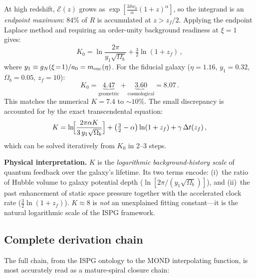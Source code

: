 \documentclass[11pt]{article}
\begin{document}
At high redshift, $\mathcal{E}(z)$ grows as
$\exp[\frac{3\delta w_0}{\alpha}(1+z)^\alpha]$, so the integrand
is an \emph{endpoint maximum}: $84\%$ of $R$ is accumulated
at $z>z_f/2$.  Applying the endpoint Laplace method and requiring
an order-unity background readiness at $\xi=1$ gives:
\begin{equation}\label{eq:K_formula}
  \boxed{K_0 = \ln\frac{2\pi}{y_1\sqrt{\Omega_b}}
  + \tfrac{3}{2}\ln(1+z_f)\,,}
\end{equation}
where $y_1\equiv g_N(\xi\!=\!1)/a_0 = m_{\rm enc}(\eta)$.
For the fiducial galaxy ($\eta=1.16$, $y_1=0.32$,
$\Omega_b=0.05$, $z_f=10$):
\[
  K_0 = \underbrace{4.47}_{\text{geometric}} +
  \underbrace{3.60}_{\text{cosmological}} = 8.07\,.
\]
This matches the numerical $K=7.4$ to $\sim 10\%$.
The small discrepancy is accounted for by the exact
transcendental equation:
\begin{equation}\label{eq:K_transcendental}
  K = \ln\!\Bigl[\frac{2\pi\alpha K}{3\,y_1\sqrt{\Omega_b}}\Bigr]
  + \bigl(\tfrac{3}{2}-\alpha\bigr)\ln(1+z_f)
  + \gamma\,\Delta t(z_f)\,,
\end{equation}
which can be solved iteratively from $K_0$ in 2--3 steps.

\medskip\noindent\textbf{Physical interpretation.}
$K$ is the \emph{logarithmic background-history scale} of quantum
feedback over the galaxy's lifetime.  Its two terms encode:
(i)~the ratio of Hubble volume to galaxy potential depth
($\ln[2\pi/(y_1\sqrt{\Omega_b})]$), and (ii)~the past enhancement
of static space pressure together with the accelerated clock rate
($\frac32\ln(1+z_f)$).
$K\approx 8$ is \emph{not} an unexplained fitting constant---it is
the natural logarithmic scale of the ISPG framework.

\subsection{Complete derivation chain}
\label{sec:derivation_chain}

The full chain, from the ISPG ontology to the MOND
interpolating function, is most accurately read as a
mature-spiral closure chain:
\end{document}
